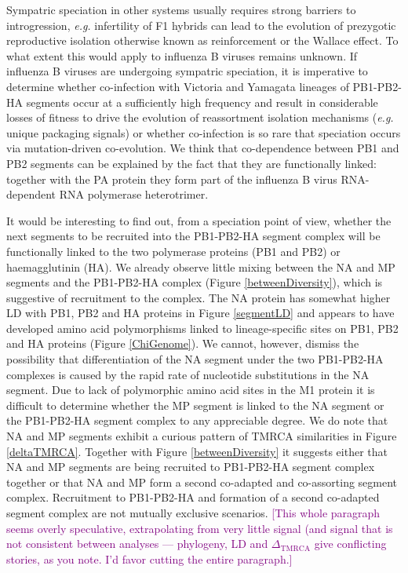 \documentclass[11pt,oneside,letterpaper]{article}
\def\tbc#1{\textcolor{purple}{[#1]}}
\newcommand{\dtmrca}{\Delta_\mathrm{TMRCA}}
\begin{document}
Sympatric speciation in other systems usually requires strong barriers to introgression, \textit{e.g.} infertility of F1 hybrids can lead to the evolution of prezygotic reproductive isolation otherwise known as reinforcement or the Wallace effect.
To what extent this would apply to influenza B viruses remains unknown.
If influenza B viruses are undergoing sympatric speciation, it is imperative to determine whether co-infection with Victoria and Yamagata lineages of PB1-PB2-HA segments occur at a sufficiently high frequency and result in considerable losses of fitness to drive the evolution of reassortment isolation mechanisms (\textit{e.g.} unique packaging signals) or whether co-infection is so rare that speciation occurs via mutation-driven co-evolution.
We think that co-dependence between PB1 and PB2 segments can be explained by the fact that they are functionally linked: together with the PA protein they form part of the influenza B virus RNA-dependent RNA polymerase heterotrimer.

It would be interesting to find out, from a speciation point of view, whether the next segments to be recruited into the PB1-PB2-HA segment complex will be functionally linked to the two polymerase proteins (PB1 and PB2) or haemagglutinin (HA).
We already observe little mixing between the NA and MP segments and the PB1-PB2-HA complex (Figure \ref{betweenDiversity}), which is suggestive of recruitment to the complex.
The NA protein has somewhat higher LD with PB1, PB2 and HA proteins in Figure \ref{segmentLD} and appears to have developed amino acid polymorphisms linked to lineage-specific sites on PB1, PB2 and HA proteins (Figure \ref{ChiGenome}). 
We cannot, however, dismiss the possibility that differentiation of the NA segment under the two PB1-PB2-HA complexes is caused by the rapid rate of nucleotide substitutions in the NA segment.
Due to lack of polymorphic amino acid sites in the M1 protein it is difficult to determine whether the MP segment is linked to the NA segment or the PB1-PB2-HA segment complex to any appreciable degree.
We do note that NA and MP segments exhibit a curious pattern of TMRCA similarities in Figure \ref{deltaTMRCA}.
Together with Figure \ref{betweenDiversity} it suggests either that NA and MP segments are being recruited to PB1-PB2-HA segment complex together or that NA and MP form a second co-adapted and co-assorting segment complex.
Recruitment to PB1-PB2-HA and formation of a second co-adapted segment complex are not mutually exclusive scenarios.
\tbc{This whole paragraph seems overly speculative, extrapolating from very little signal (and signal that is not consistent between analyses --- phylogeny, LD and $\dtmrca$ give conflicting stories, as you note.  I'd favor cutting the entire paragraph.}
\end{document}
